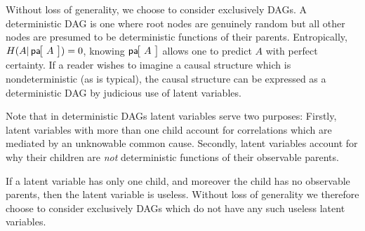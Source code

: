 Without loss of generality, we choose to consider exclusively  DAGs. A deterministic DAG is one where root nodes are genuinely random but all other nodes are presumed to be deterministic functions of their parents. Entropically, $H(A|\NamedFunction{pa}{\!A\!})=0$, knowing $\NamedFunction{pa}{\!A\!}$ allows one to predict $A$ with perfect certainty. If a reader wishes to imagine a causal structure which is nondeterministic (as is typical), the causal structure can be expressed as a deterministic DAG by judicious use of latent variables.

Note that in deterministic DAGs latent variables serve two purposes: Firstly, latent variables with more than one child account for correlations which are mediated by an unknowable common cause. Secondly, latent variables account for why their children are \emph{not} deterministic functions of their observable parents.

If a latent variable has only one child, and moreover the child has no observable parents, then the latent variable is useless.  Without loss of generality we therefore choose to consider exclusively DAGs which do not have any such useless latent variables. %

 




